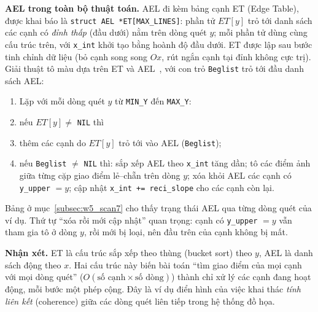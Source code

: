 \textbf{AEL trong toàn bộ thuật toán.} AEL đi kèm bảng cạnh ET (Edge Table), được khai báo là \texttt{struct AEL *ET[MAX\_LINES]}: phần tử $ET[y]$ trỏ tới danh sách các cạnh có \emph{đỉnh thấp} (đầu dưới) nằm trên dòng quét $y$; mỗi phần tử dùng cùng cấu trúc trên, với \texttt{x\_int} khởi tạo bằng hoành độ đầu dưới. ET được lập sau bước tinh chỉnh dữ liệu (bỏ cạnh song song $Ox$, rút ngắn cạnh tại đỉnh không cực trị). Giải thuật tô màu dựa trên ET và AEL~\citep{dhmt_lec7}, với con trỏ \texttt{Beglist} trỏ tới đầu danh sách AEL:
\begin{enumerate}[label=L\arabic*.]
    \item Lặp với mỗi dòng quét $y$ từ \texttt{MIN\_Y} đến \texttt{MAX\_Y}:
    \item \quad nếu $ET[y] \ne$ \texttt{NIL} thì
    \item \quad\quad thêm các cạnh do $ET[y]$ trỏ tới vào AEL (\texttt{Beglist});
    \item \quad nếu \texttt{Beglist} $\ne$ \texttt{NIL} thì: sắp xếp AEL theo \texttt{x\_int} tăng dần; tô các điểm ảnh giữa từng cặp giao điểm lẻ--chẵn trên dòng $y$; xóa khỏi AEL các cạnh có \texttt{y\_upper} $= y$; cập nhật \texttt{x\_int += reci\_slope} cho các cạnh còn lại.
\end{enumerate}
Bảng ở mục~\ref{subsec:w5_scan7} cho thấy trạng thái AEL qua từng dòng quét của ví dụ. Thứ tự ``xóa rồi mới cập nhật'' quan trọng: cạnh có \texttt{y\_upper} $= y$ vẫn tham gia tô ở dòng $y$, rồi mới bị loại, nên đầu trên của cạnh không bị mất.

\textbf{Nhận xét.} ET là cấu trúc sắp xếp theo thùng (bucket sort) theo $y$, AEL là danh sách động theo $x$. Hai cấu trúc này biến bài toán ``tìm giao điểm của mọi cạnh với mọi dòng quét'' ($O(\text{số cạnh} \times \text{số dòng})$) thành chỉ xử lý các cạnh đang hoạt động, mỗi bước một phép cộng. Đây là ví dụ điển hình của việc khai thác \emph{tính liên kết} (coherence) giữa các dòng quét liên tiếp trong hệ thống đồ họa.
